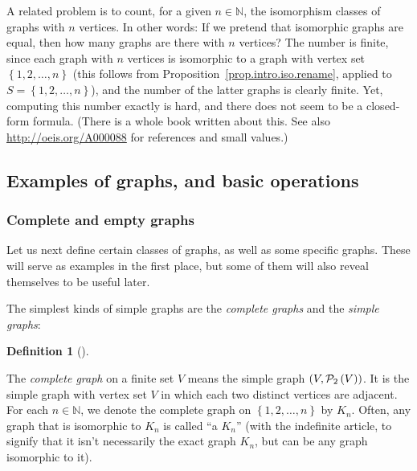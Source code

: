 \documentclass[numbers=enddot,12pt,final,onecolumn,notitlepage]{scrartcl}%
\theoremstyle{definition}
\newtheorem{defi}[theo]{Definition}
\newenvironment{definition}[1][]
{\begin{defi}[#1]\begin{leftbar}}
{\end{leftbar}\end{defi}}
\newcommand{\NN}{\mathbb{N}}
\newcommand{\powset}[2][]{\ifthenelse{\equal{#2}{}}{\mathcal{P}\left(#1\right)}{\mathcal{P}_{#1}\left(#2\right)}}
\newcommand{\set}[1]{\left\{ #1 \right\}}
\newcommand{\tup}[1]{\left( #1 \right)}
\begin{document}
A related problem is to count, for a given $n \in \NN$,
the isomorphism classes of graphs with $n$ vertices. In other words:
If we pretend that isomorphic graphs are equal, then how many graphs
are there with $n$ vertices? The number is finite, since each graph
with $n$ vertices is isomorphic to a graph with vertex set
$\set{1,2,\ldots, n}$ (this follows from
Proposition~\ref{prop.intro.iso.rename}, applied to
$S = \set{1,2,\ldots, n}$), and the number of the latter graphs is
clearly finite. Yet, computing this number exactly is hard, and there
does not seem to be a closed-form formula. (There is a whole book
\cite{HarPal73} written about this. See also
\url{http://oeis.org/A000088} for references and small values.)

\subsection{\label{sect.intro.paths}Examples of graphs, and basic
operations}

\subsubsection{Complete and empty graphs}

Let us next define certain classes of graphs, as well as some specific
graphs. These will serve as examples in the first place, but some of
them will also reveal themselves to be useful later.

The simplest kinds of simple graphs are the \textit{complete graphs}
and the \textit{simple graphs}:

\begin{definition} \label{def.intro.complete-graph}
The \textit{complete graph} on a finite set $V$ means
the simple graph $\tup{V, \powset[2]{V}}$. It is the
simple graph with vertex set $V$ in which each two distinct vertices
are adjacent.
For each $n \in \NN$, we denote the complete graph on
$\set{1,2,\ldots,n}$ by $K_n$. Often, any graph that is isomorphic to
$K_n$ is called ``a $K_n$'' (with the indefinite article, to signify
that it isn't necessarily the exact graph $K_n$, but can be any graph
isomorphic to it).
\end{definition}
\end{document}
